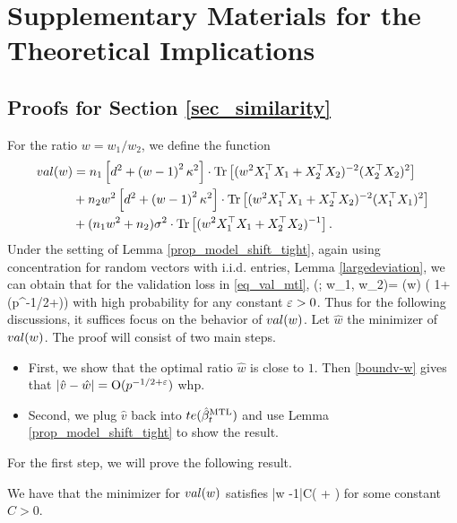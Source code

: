 \section{Supplementary Materials for the Theoretical Implications}

\subsection{Proofs for Section \ref{sec_similarity}}\label{app_proof_31}

For the ratio $w=w_1/w_2$, we define the function
\begin{align}
	val(w) &= n_1\left[d^2 +\left( w-1\right)^2\kappa^2\right]\cdot \operatorname{Tr}\left[( w^2X_1^{\top}X_1 +X_2^{\top}X_2)^{-2} (X_2^{\top}X_2)^2\right] \nonumber \\
	& + n_2w^2\left[d^2 +\left( w-1\right)^2\kappa^2\right]\cdot \operatorname{Tr}\left[( w^2X_1^{\top}X_1 +X_2^{\top}X_2)^{-2} (X_1^{\top}X_1)^2\right] \nonumber\\
			& + (n_1 w^2 +n_2)\sigma^2 \cdot \operatorname{Tr}\left[(w^2X_1^{\top}X_1  + X_2^{\top}X_2)^{-1} \right]. \nonumber
\end{align}
Under the setting of Lemma \ref{prop_model_shift_tight}, again using concentration for random vectors with i.i.d. entries, Lemma \ref{largedeviation}, we can obtain that for the validation loss in \eqref{eq_val_mtl},
\be\label{boundv-w}\val(; w_1, w_2)= \val(w) \left( 1+\OO(p^{-1/2+\e})\right)\ee
with high probability for any constant ${\varepsilon}>0$. Thus for the following discussions, it suffices focus on the behavior of $val (w)$. Let $\hat w$ the minimizer of $val(w)$. The proof will consist of two main steps.
\begin{itemize}
	\item First, we show that the optimal ratio $\hat{w}$ is close to $1$. Then \eqref{boundv-w} gives that $|\hat v - \hat w|=\operatorname{O}(p^{-1/2+{\varepsilon}})$ whp.
	\item Second, we plug $\hat{v}$ back into $te(\hat{\beta}_t^{\text{MTL}})$ and use Lemma \ref{prop_model_shift_tight} to show the result.
\end{itemize}
For the first step, we will prove the following result.
\begin{lemma}\label{lem_hat_v}
We have that the minimizer for $val(w)$ satisfies
	\be\label{hatw_add1}|\hat w -1|\le C\left( + \right)\ee
	for some constant $C>0$.
\end{lemma}
